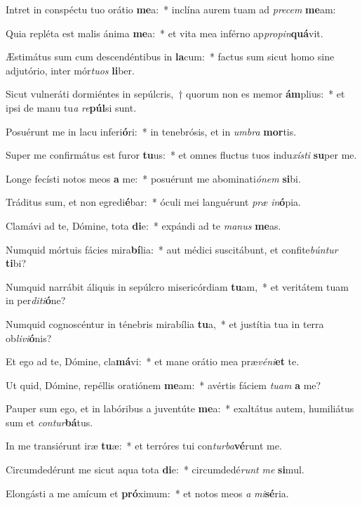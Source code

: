 \item Intret in conspéctu tuo orátio \textbf{me}a:~* inclína aurem tuam ad \textit{precem} \textbf{me}am:
\item Quia repléta est malis ánima \textbf{me}a:~* et vita mea inférno ap\textit{propin}\textbf{quá}vit.
\item Æstimátus sum cum descendéntibus in \textbf{la}cum:~* factus sum sicut homo sine adjutório, inter mór\textit{tuos} \textbf{li}ber.
\item Sicut vulneráti dormiéntes in sepúlcris,~† quorum non es memor \textbf{ám}plius:~* et ipsi de manu tu\spurhspace\textit{a} \textit{re}\textbf{púl}si sunt.
\item Posuérunt me in lacu inferi\textbf{ó}ri:~* in tenebrósis, et in \textit{umbra} \textbf{mor}tis.
\item Super me confirmátus est furor \textbf{tu}us:~* et omnes fluctus tuos indu\spurhspace\textit{xísti} \textbf{su}per me.
\item Longe fecísti notos meos \textbf{a} me:~* posuérunt me abominati\tinyhspace\textit{ónem} \textbf{si}bi.
\item Tráditus sum, et non egredi\textbf{é}bar:~* óculi mei languérunt \textit{præ} \textit{in}\textbf{ó}pia.
\item Clamávi ad te, Dómine, tota \textbf{di}e:~* expándi ad te \textit{manus} \textbf{me}as.
\item Numquid mórtuis fácies mira\textbf{bí}lia:~* aut médici suscitábunt, et confite\textit{búntur} \textbf{ti}bi?
\item Numquid narrábit áliquis in sepúlcro misericórdiam \textbf{tu}am,~* et veritátem tuam in per\textit{diti}\textbf{ó}ne?
\item Numquid cognoscéntur in ténebris mirabília \textbf{tu}a,~* et justítia tua in terra ob\textit{livi}\textbf{ó}nis?
\item Et ego ad te, Dómine, cla\textbf{má}vi:~* et mane orátio mea præ\textit{véni}\textbf{et} te.
\item Ut quid, Dómine, repéllis oratiónem \textbf{me}am:~* avértis fáciem \textit{tuam} \textbf{a} me?
\item Pauper sum ego, et in labóribus a juventúte \textbf{me}a:~* exaltátus autem, humiliátus sum et \textit{contur}\textbf{bá}tus.
\item In me transiérunt iræ \textbf{tu}æ:~* et terróres tui con\textit{turba}\textbf{vé}runt me.
\item Circumdedérunt me sicut aqua tota \textbf{di}e:~* circumdedé\textit{runt} \textit{me} \textbf{si}mul.
\item Elongásti a me amícum et \textbf{pró}ximum:~* et notos meos \textit{a} \textit{mi}\textbf{sé}ria.
